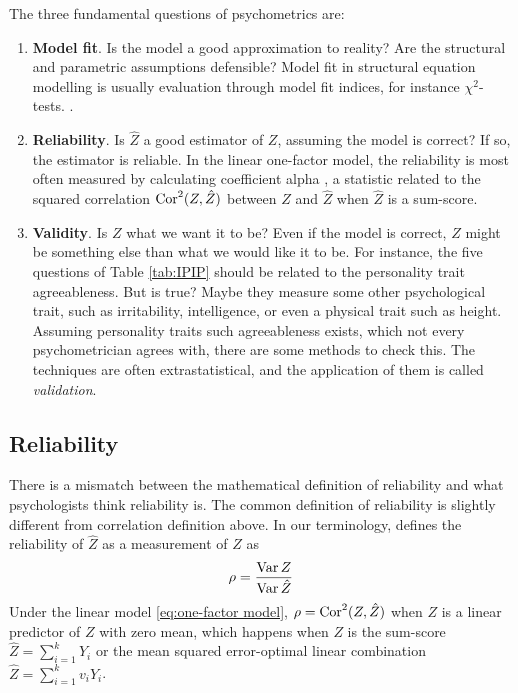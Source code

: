 The three fundamental questions of psychometrics are:
\begin{enumerate}
\item \textbf{Model fit}. Is the model a good approximation to reality? Are the structural and parametric assumptions defensible? Model fit in structural equation modelling is usually evaluation through model fit indices, for instance $\chi^{2}$-tests. \parencite[Chapter 15]{Mulaik2009-gc}.
\item \textbf{Reliability}. Is $\hat{Z}$ a good estimator of $Z$, assuming the model is correct? If so, the estimator is reliable. In the linear one-factor model, the reliability is most often measured by calculating coefficient alpha \parencite{Cronbach1951-in}, a statistic related to the squared correlation $\operatorname{Cor}^{2}(Z,\hat{Z})$ between $Z$ and $\hat{Z}$ when $\hat{Z}$ is a sum-score.
\item \textbf{Validity}. Is $Z$ what we want it to be? Even if the model is correct, $Z$ might be something else than what we would like it to be. For instance, the five questions of Table \ref{tab:IPIP} should be related to the personality trait agreeableness. But is true? Maybe they measure some other psychological trait, such as irritability, intelligence, or even a physical trait such as height. Assuming personality traits such agreeableness exists, which not every psychometrician agrees with, there are some methods to check this. The techniques are often extrastatistical, and the application of them is called \emph{validation}. \parencite[Chapter 6]{Borsboom2005-iq}
\end{enumerate}

\subsection{Reliability}

There is a mismatch between the mathematical definition of reliability and what psychologists think reliability is. The common definition of reliability is slightly different from correlation definition above. In our terminology, \textcite[Equation 3]{Raykov2019-yr} defines the reliability of $\hat{Z}$ as a measurement of $Z$ as
\begin{equation}
\rho=\frac{\operatorname{Var} Z}{\operatorname{Var}\hat{Z}}\label{eq:rakov-reliabiliy}
\end{equation} Under the linear model \eqref{eq:one-factor model}, $\rho = \operatorname{Cor}^2(Z,\hat{Z})$ when $Z$ is a linear predictor of $Z$ with zero mean, which happens when $Z$ is the sum-score $\hat{Z}=\sum_{i=1}^{k}Y_{i}$ or the mean squared error-optimal linear combination $\hat{Z}=\sum_{i=1}^{k}v_{i}Y_{i}$.

